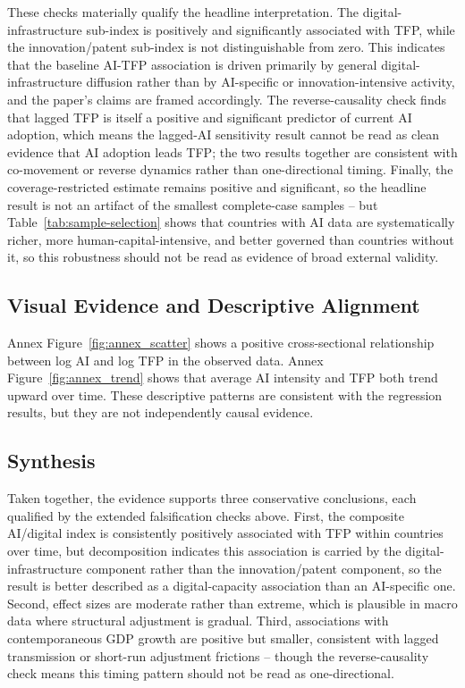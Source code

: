 These checks materially qualify the headline interpretation. The digital-infrastructure sub-index is positively and significantly associated with TFP, while the innovation/patent sub-index is not distinguishable from zero. This indicates that the baseline AI-TFP association is driven primarily by general digital-infrastructure diffusion rather than by AI-specific or innovation-intensive activity, and the paper's claims are framed accordingly. The reverse-causality check finds that lagged TFP is itself a positive and significant predictor of current AI adoption, which means the lagged-AI sensitivity result cannot be read as clean evidence that AI adoption leads TFP; the two results together are consistent with co-movement or reverse dynamics rather than one-directional timing. Finally, the coverage-restricted estimate remains positive and significant, so the headline result is not an artifact of the smallest complete-case samples -- but Table~\ref{tab:sample-selection} shows that countries with AI data are systematically richer, more human-capital-intensive, and better governed than countries without it, so this robustness should not be read as evidence of broad external validity.

\subsection{Visual Evidence and Descriptive Alignment}

Annex Figure~\ref{fig:annex_scatter} shows a positive cross-sectional relationship between log AI and log TFP in the observed data. Annex Figure~\ref{fig:annex_trend} shows that average AI intensity and TFP both trend upward over time. These descriptive patterns are consistent with the regression results, but they are not independently causal evidence.

\subsection{Synthesis}

Taken together, the evidence supports three conservative conclusions, each qualified by the extended falsification checks above. First, the composite AI/digital index is consistently positively associated with TFP within countries over time, but decomposition indicates this association is carried by the digital-infrastructure component rather than the innovation/patent component, so the result is better described as a digital-capacity association than an AI-specific one. Second, effect sizes are moderate rather than extreme, which is plausible in macro data where structural adjustment is gradual. Third, associations with contemporaneous GDP growth are positive but smaller, consistent with lagged transmission or short-run adjustment frictions -- though the reverse-causality check means this timing pattern should not be read as one-directional.
